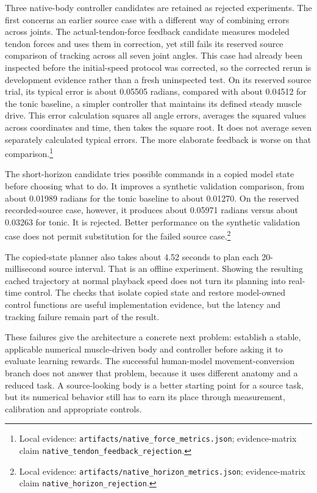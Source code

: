 Three native-body controller candidates are retained as rejected experiments. The first concerns an earlier source case with a different way of combining errors across joints. The actual-tendon-force feedback candidate measures modeled tendon forces and uses them in correction, yet still fails its reserved source comparison of tracking across all seven joint angles. This case had already been inspected before the initial-speed protocol was corrected, so the corrected rerun is development evidence rather than a fresh uninspected test. On its reserved source trial, its typical error is about 0.05505 radians, compared with about 0.04512 for the tonic baseline, a simpler controller that maintains its defined steady muscle drive. This error calculation squares all angle errors, averages the squared values across coordinates and time, then takes the square root. It does not average seven separately calculated typical errors. The more elaborate feedback is worse on that comparison.\footnote{Local evidence: \texttt{artifacts/native\_force\_metrics.json}; evidence-matrix claim \texttt{\mbox{native}\_\allowbreak{}\mbox{tendon}\_\allowbreak{}\mbox{feedback}\_\allowbreak{}\mbox{rejection}}.}

The short-horizon candidate tries possible commands in a copied model state before choosing what to do. It improves a synthetic validation comparison, from about 0.01989 radians for the tonic baseline to about 0.01270. On the reserved recorded-source case, however, it produces about 0.05971 radians versus about 0.03263 for tonic. It is rejected. Better performance on the synthetic validation case does not permit substitution for the failed source case.\footnote{Local evidence: \texttt{artifacts/native\_horizon\_metrics.json}; evidence-matrix claim \texttt{\mbox{native}\_\allowbreak{}\mbox{horizon}\_\allowbreak{}\mbox{rejection}}.}

The copied-state planner also takes about 4.52 seconds to plan each 20-millisecond source interval. That is an offline experiment. Showing the resulting cached trajectory at normal playback speed does not turn its planning into real-time control. The checks that isolate copied state and restore model-owned control functions are useful implementation evidence, but the latency and tracking failure remain part of the result.

These failures give the architecture a concrete next problem: establish a stable, applicable numerical muscle-driven body and controller before asking it to evaluate learning rewards. The successful human-model movement-conversion branch does not answer that problem, because it uses different anatomy and a reduced task. A source-looking body is a better starting point for a source task, but its numerical behavior still has to earn its place through measurement, calibration and appropriate controls.

